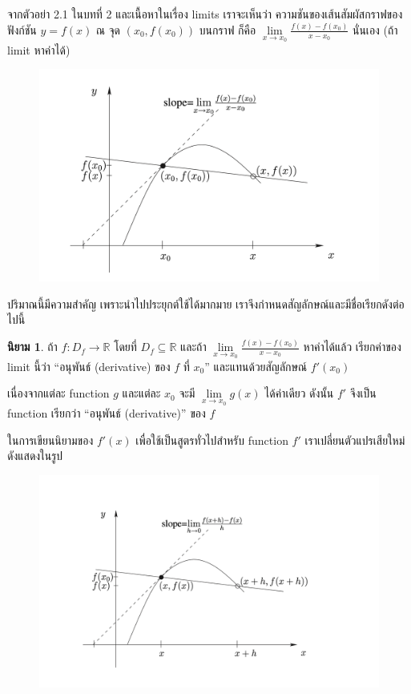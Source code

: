 \documentclass[
]{book}
\theoremstyle{definition}
\newtheorem{definition}{นิยาม}[chapter]
\theoremstyle{definition}
\theoremstyle{definition}
\theoremstyle{definition}
\theoremstyle{remark}
\begin{document}
จากตัวอย่า 2.1 ในบทที่ 2 และเนื้อหาในเรื่อง limits เราจะเห็นว่า
ความชันของเส้นสัมผัสกราฟของฟังก์ชัน \(y=f\left( x\right)\) ณ จุด
\(\left( x_{0},f\left( x_{0}\right) \right)\) บนกราฟ ก็คือ
\(\underset{x\rightarrow x_{0}}{\lim}\frac{f\left( x\right) -f\left( x_{0}\right) }{x-x_{0}}\)
นั่นเอง (ถ้า limit หาค่าได้)

\begin{figure}

{\centering \includegraphics[width=0.5\linewidth]{images/fig-derivative-1} 

}

\end{figure}

ปริมาณนี้มีความสำคัญ เพราะนำไปประยุกต์ใช้ได้มากมาย
เราจึงกำหนดสัญลักษณ์และมีชื่อเรียกดังต่อไปนี้

\begin{definition}
ถ้า \(f : D_f \rightarrow \mathbb{R}\) โดยที่ \(D_f \subseteq \mathbb{R}\)
และถ้า \(\underset{x \rightarrow x_0}{\lim} \frac{f(x)-f(x_0)}{x- x_0}\)
หาค่าได้แล้ว เรียกค่าของ limit นี้ว่า ``อนุพันธ์ (derivative) ของ \(f\) ที่ \(x_0\)''
และแทนด้วยสัญลักษณ์ \(f'(x_0)\)
\end{definition}

เนื่องจากแต่ละ function \(g\) และแต่ละ \(x_0\) จะมี
\(\underset{x \rightarrow x_0}{\lim}g(x)\) ได้ค่าเดียว ดังนั้น \(f'\) จึงเป็น
function เรียกว่า ``อนุพันธ์ (derivative)'' ของ \(f\)

ในการเขียนนิยามของ \(f'(x)\) เพื่อใช้เป็นสูตรทั่วไปสำหรับ function \(f'\)
เราเปลี่ยนตัวแปรเสียใหม่ ดังแสดงในรูป

\begin{figure}

{\centering \includegraphics[width=0.5\linewidth]{images/fig-derivative-2} 

}

\end{figure}
\end{document}
